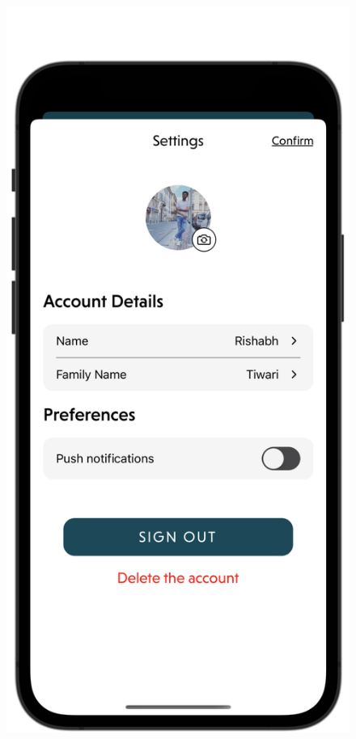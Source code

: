 \begin{figure}[H]
    \centering
    \begin{minipage}[b]{0.43\linewidth}
        \centering
        \includegraphics[width=\linewidth]{Mobile UI/Account Settings.png}

\end{minipage}
\end{figure}
